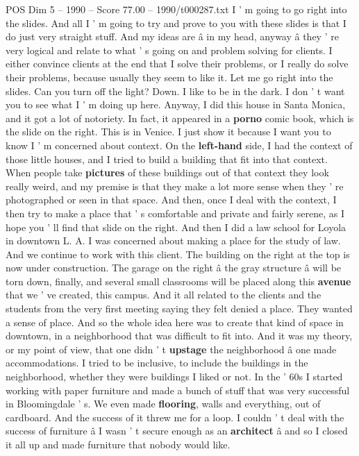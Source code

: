 \begin{textsample}{POS Dim 5 – 1990 – Score 77.00 – 1990/t000287.txt}  \label{ex:f5_pos_001}
I ' m going to go right into the slides.
And all I ' m going to try and prove to you with these slides is that I do just very straight stuff.
And my ideas are â in my head, anyway â they ' re very logical and relate to what ' s going on and problem solving for clients.
I either convince clients at the end that I solve their problems, or I really do solve their problems, because usually they seem to like it.
Let me go right into the slides.
Can you turn off the light?
Down.
I like to be in the dark.
I don ' t want you to see what I ' m doing up here.
Anyway, I did this house in Santa Monica, and it got a lot of notoriety.
In fact, it appeared in a \textbf{porno} comic book, which is the slide on the right.
This is in Venice.
I just show it because I want you to know I ' m concerned about context.
On the \textbf{left-hand} side, I had the context of those little houses, and I tried to build a building that fit into that context.
When people take \textbf{pictures} of these buildings out of that context they look really weird, and my premise is that they make a lot more sense when they ' re photographed or seen in that space.
And then, once I deal with the context, I then try to make a place that ' s comfortable and private and fairly serene, as I hope you ' ll find that slide on the right.
And then I did a law school for Loyola in downtown L.
A.
I was concerned about making a place for the study of law.
And we continue to work with this client.
The building on the right at the top is now under construction.
The garage on the right â the gray structure â will be torn down, finally, and several small classrooms will be placed along this \textbf{avenue} that we ' ve created, this campus.
And it all related to the clients and the students from the very first meeting saying they felt denied a place.
They wanted a sense of place.
And so the whole idea here was to create that kind of space in downtown, in a neighborhood that was difficult to fit into.
And it was my theory, or my point of view, that one didn ' t \textbf{upstage} the neighborhood â one made accommodations.
I tried to be inclusive, to include the buildings in the neighborhood, whether they were buildings I liked or not.
In the ' 60s I started working with paper furniture and made a bunch of stuff that was very successful in Bloomingdale ' s.
We even made \textbf{flooring}, walls and everything, out of cardboard.
And the success of it threw me for a loop.
I couldn ' t deal with the success of furniture â I wasn ' t secure enough as an \textbf{architect} â and so I closed it all up and made furniture that nobody would like.

\end{textsample}
